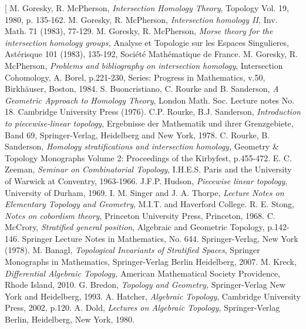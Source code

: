 \documentclass{scrreprt}
\begin{document}
\begin{thebibliography}[
M. Goresky, R. McPherson, \textit{Intersection Homology Theory}, Topology Vol. 19, 1980, p. 135-162.
M. Goresky, R. McPherson, \textit{Intersection homology II,} Inv. Math. 71 (1983), 77-129.
M. Goresky, R. McPherson, \textit{Morse theory for the intersection homology groups,}  Analyse et Topologie sur les Espaces Singulieres, Ast\'{e}risque 101 (1983), 135-192, Soci\'{e}t\'{e} Math\'{e}matique de France.
M. Goresky, R. McPherson, \textit{Problems and bibliography on intersection homology}, Intersection Cohomology, A. Borel, p.221-230, Series: Progress in Mathematics, v.50, Birkh\"auser, Boston, 1984.
S. Buoncristiano, C. Rourke and B. Sanderson, \textit{A Geometric Approach to Homology Theory}, London Math. Soc. Lecture notes No. 18. Cambridge University Press (1976).
C.P. Rourke, B.J. Sanderson, \textit{Introduction to piecewise-linear topology}, Ergebnisse der Mathematik und ihrer Grenzgebiete, Band 69, Springer-Verlag, Heidelberg and New York, 1978.
C. Rourke, B. Sanderson, \textit{Homology stratifications and intersection homology,} Geometry \& Topology Monographs Volume 2: Proceedings of the Kirbyfest, p.455-472.
E. C. Zeeman, \textit{Seminar on Combinatorial Topology}, I.H.E.S. Paris and the University of Warwick at Conventry, 1963-1966.
J.F.P. Hudson, \textit{Piecewise linear topology}, University of Durham, 1969.
I. M. Singer and J. A. Thorpe, \textit{Lecture Notes on Elementary Topology and Geometry}, M.I.T. and Haverford College.
R. E. Stong, \textit{Notes on cobordism theory}, Princeton University Press, Princeton, 1968.
C. McCrory, \textit{Stratified general position}, Algebraic and Geometric Topology, p.142-146. Springer Lecture Notes in Mathematics, No. 644. Springer-Verlag, New York (1978).
M. Banagl, \textit{Topological Invariants of Stratified Spaces}, Springer Monographs in Mathematics, Springer-Verlag Berlin Heidelberg, 2007.
M. Kreck, \textit{Differential Algebraic Topology,} American Mathematical Society Providence, Rhode Island, 2010.
G. Bredon, \textit{Topology and Geometry,} Springer-Verlag New York and Heidelberg, 1993.
A. Hatcher, \textit{Algebraic Topology}, Cambridge University Press, 2002, p.120.
A. Dold, \textit{Lectures on Algebraic Topology,} Springer-Verlag Berlin, Heidelberg, New York, 1980.

\end{thebibliography}
\end{document}
